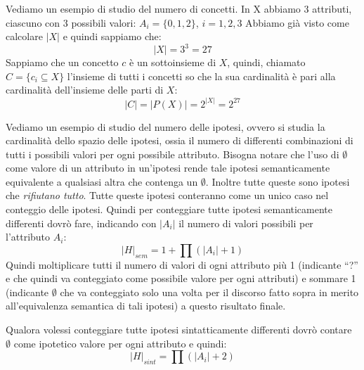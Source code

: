 Vediamo un esempio di studio del numero di concetti. In X abbiamo 3 attributi,
ciascuno con 3 possibili valori: $A_i = \{0, 1, 2\}$, $i = 1, 2, 3$ Abbiamo già
visto come calcolare $|X|$ e quindi sappiamo che: $$|X| = 3^3 = 27$$ Sappiamo che
un concetto $c$ è un sottoinsieme di $X$, quindi, chiamato $C = \{c_i \subseteq X\}$
l'insieme di tutti i concetti so che la sua cardinalità è pari
alla cardinalità dell'insieme delle parti di $X$: $$|C| = |P(X)| = 2^{|X|} = 2^{27}$$

Vediamo un esempio di studio del numero delle ipotesi, ovvero si studia la
cardinalità dello spazio delle ipotesi, ossia il numero di differenti combinazioni
di tutti i possibili valori per ogni possibile attributo. Bisogna notare che l'uso
di $\emptyset$ come valore di un attributo in un'ipotesi rende tale ipotesi
semanticamente equivalente a qualsiasi altra che contenga un $\emptyset$. Inoltre
tutte queste sono ipotesi che \textit{rifiutano tutto}. Tutte queste ipotesi
conteranno come un unico caso nel conteggio delle ipotesi. Quindi per conteggiare
tutte ipotesi semanticamente differenti dovrò fare, indicando con $|A_i|$ il
numero di valori possibili per l'attributo $A_i$:
\begin{equation}
    |H|_{sem} = 1 + \prod (|A_i| + 1)
\end{equation}
Quindi moltiplicare tutti il numero di valori di ogni attributo più 1 (indicante
“?” e che quindi va conteggiato come possibile valore per ogni attributi) e sommare
1 (indicante $\emptyset$ che va conteggiato solo una volta per il discorso fatto
sopra in merito all'equivalenza semantica di tali ipotesi) a questo risultato finale.

Qualora volessi conteggiare tutte ipotesi sintatticamente differenti dovrò
contare $\emptyset$ come ipotetico valore per ogni attributo e quindi:
\begin{equation}
    |H|_{sint} = \prod (|A_i| + 2)
\end{equation}
